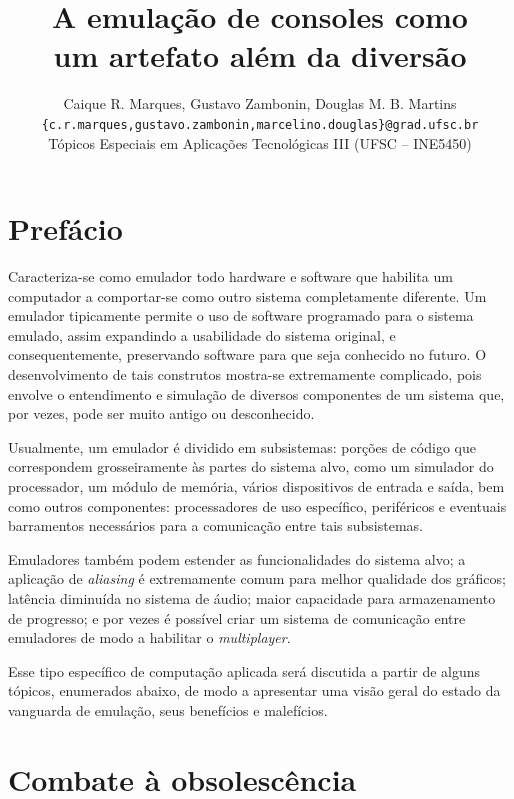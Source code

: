 \documentclass[12pt]{article}
\title{\textbf{A emulação de consoles como \\ um artefato além da diversão}}
\author{
    Caique R. Marques, Gustavo Zambonin, Douglas M. B. Martins \\
    \small{\texttt{\{c.r.marques,gustavo.zambonin,marcelino.douglas\}@grad.ufsc.br}} \\
    \small{Tópicos Especiais em Aplicações Tecnológicas III (UFSC -- INE5450)}
}
\date{}
\begin{document}
\maketitle

\section{Prefácio}

Caracteriza-se como emulador todo hardware e software que habilita um computador
a comportar-se como outro sistema completamente diferente. Um emulador
tipicamente permite o uso de software programado para o sistema emulado, assim
expandindo a usabilidade do sistema original, e consequentemente, preservando
software para que seja conhecido no futuro. O desenvolvimento de tais construtos
mostra-se extremamente complicado, pois envolve o entendimento e simulação de
diversos componentes de um sistema que, por vezes, pode ser muito antigo ou
desconhecido.

Usualmente, um emulador é dividido em subsistemas: porções de código que
correspondem grosseiramente às partes do sistema alvo, como um simulador do
processador, um módulo de memória, vários dispositivos de entrada e saída, bem
como outros componentes: processadores de uso específico, periféricos e
eventuais barramentos necessários para a comunicação entre tais subsistemas.

Emuladores também podem estender as funcionalidades do sistema alvo; a aplicação
de \emph{aliasing} é extremamente comum para melhor qualidade dos gráficos;
latência diminuída no sistema de áudio; maior capacidade para armazenamento de
progresso; e por vezes é possível criar um sistema de comunicação entre
emuladores de modo a habilitar o \emph{multiplayer}.

Esse tipo específico de computação aplicada será discutida a partir de alguns
tópicos, enumerados abaixo, de modo a apresentar uma visão geral do estado da
vanguarda de emulação, seus benefícios e malefícios.

\section{Combate à obsolescência}
\end{document}
